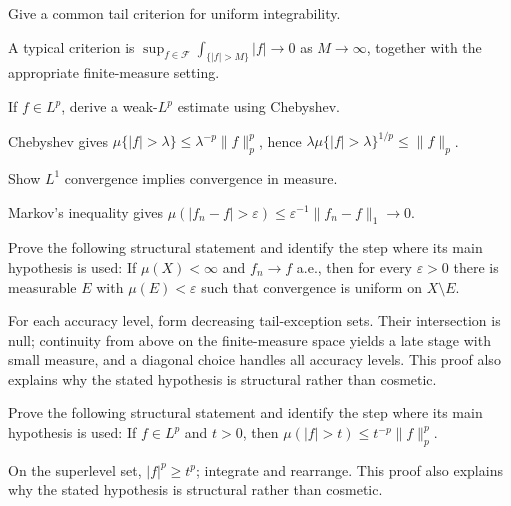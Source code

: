 \begin{problem}\label{prob:iii08-problem-06}
Give a common tail criterion for uniform integrability.
\end{problem}
\begin{solution}
A typical criterion is
\(\sup_{f\in\mathcal F}\int_{\{|f|>M\}}|f|\to0\) as \(M\to\infty\), together
with the appropriate finite-measure setting.
\end{solution}

\begin{problem}\label{prob:iii08-problem-07}
If \(f\in L^p\), derive a weak-\(L^p\) estimate using Chebyshev.
\end{problem}
\begin{solution}
Chebyshev gives
\(\mu\{|f|>\lambda\}\le\lambda^{-p}\|f\|_p^p\), hence
\(\lambda\mu\{|f|>\lambda\}^{1/p}\le\|f\|_p\).
\end{solution}

\begin{problem}\label{prob:iii08-problem-08}
Show \(L^1\) convergence implies convergence in measure.
\end{problem}
\begin{solution}
Markov's inequality gives
\(\mu(|f_n-f|>\varepsilon)\le\varepsilon^{-1}\|f_n-f\|_1\to0\).
\end{solution}

\begin{problem}\label{prob:iii08-problem-09}
Prove the following structural statement and identify the step where its main hypothesis is used: If $\mu(X)<\infty$ and $f_n\to f$ a.e., then for every $\varepsilon>0$ there is measurable $E$ with $\mu(E)<\varepsilon$ such that convergence is uniform on $X\setminus E$.
\end{problem}
\begin{solution}
For each accuracy level, form decreasing tail-exception sets. Their intersection is null; continuity from above on the finite-measure space yields a late stage with small measure, and a diagonal choice handles all accuracy levels. This proof also explains why the stated hypothesis is structural rather than cosmetic.
\end{solution}

\begin{problem}\label{prob:iii08-problem-10}
Prove the following structural statement and identify the step where its main hypothesis is used: If $f\in L^p$ and $t>0$, then $\mu(|f|>t)\le t^{-p}\|f\|_p^p$.
\end{problem}
\begin{solution}
On the superlevel set, $|f|^p\ge t^p$; integrate and rearrange. This proof also explains why the stated hypothesis is structural rather than cosmetic.
\end{solution}

